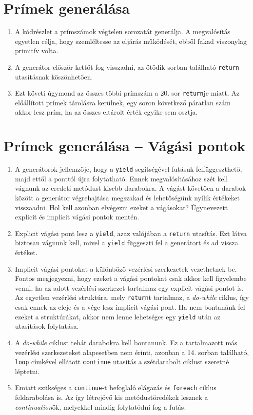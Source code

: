 \documentclass[12pt, a4paper]{article}
\begin{document}
\section{Prímek generálása}

\begin{enumerate}
    \item
    A kódrészlet a prímszámok végtelen sorozatát generálja. A megvalósítás egyetlen célja, hogy szemléltesse az eljárás működését, ebből fakad viszonylag primitív volta.
    \item
    A generátor először kettőt fog visszadni, az ötödik sorban található \texttt{return} utasításnak köszönhetően.
    \item
    Ezt követi úgymond az összes többi prímszám a 20. sor \texttt{return}je miatt.  Az előállított prímek tárolásra kerülnek, egy soron következő páratlan szám akkor lesz prím, ha az összes eltárolt érték egyike sem osztja.
\end{enumerate}

\section{Prímek generálása -- Vágási pontok}

\begin{enumerate}
   \item
   A generátorok jellemzője, hogy a \texttt{yield} segítségével futásuk felfüggeszthető, majd ettől a ponttól újra folytatható. Ennek megvalósításához szét kell vágnunk az eredeti metódust kisebb darabokra. A vágást követően a darabok között a generátor végrehajtása megszakad és lehetőségünk nyílik értékeket visszaadni. Hol kell azonban elvégezni ezeket a vágásokat? Úgynevezett explicit és implicit vágási pontok mentén.
   \item
   Explicit vágási pont lesz a \texttt{yield}, azaz valójában a \texttt{return} utasítás. Ezt látva biztosan vágnunk kell, mivel a \texttt{yield} függeszti fel a generátort és ad vissza értéket.
   \item
   Implicit vágási pontokat a különböző vezérlési szerkezetek vezethetnek be. Fontos megjegyezni, hogy ezeket a vágási pontokat csak akkor kell figyelembe venni, ha az adott vezérlési szerkezet tartalmaz egy explicit vágási pontot is. Az egyetlen vezérlési struktúra, mely \texttt{return}t tartalmaz, a \textit{do-while} ciklus, így csak ennek az eleje és a vége lesz implicit vágási pont. Ha nem bontanánk fel ezeket a struktúrákat, akkor nem lenne lehetséges egy \texttt{yield} után az utasítások folytatása.
   \item
   A \textit{do-while} ciklust tehát darabokra kell bontanunk. Ez a tartalmazott más vezérlési szerkezeteket alapesetben nem érinti, azonban a 14. sorban található, \texttt{loop} címkével ellátott \texttt{continue} utasítás a szétdarabolt ciklust szeretné léptetni.
   \item
   Emiatt szükséges a \texttt{continue}-t befoglaló elágazás és \texttt{foreach} ciklus feldarabolása is. Az így létrejövő kis metódustöredékek lesznek a \textit{continuation}ök, melyekkel mindig folytatódni fog a futás.
\end{enumerate}
\end{document}

